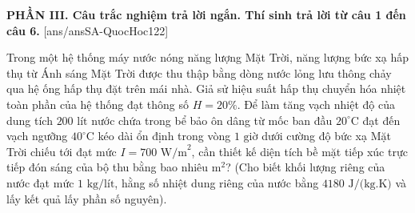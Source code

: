 
\noindent \textbf{PHẦN III. Câu trắc nghiệm trả lời ngắn. Thí sinh trả lời từ câu 1 đến câu 6.}
[ans/ansSA-QuocHoc122]

\begin{ex}%
	Trong một hệ thống máy nước nóng năng lượng Mặt Trời, năng lượng bức xạ hấp thụ từ Ánh sáng Mặt Trời được thu thập bằng dòng nước lỏng lưu thông chảy qua hệ ống hấp thụ đặt trên mái nhà. Giả sử hiệu suất hấp thụ chuyển hóa nhiệt toàn phần của hệ thống đạt thông số $H = 20\%$. Để làm tăng vạch nhiệt độ của dung tích $200\text{ lít}$ nước chứa trong bể bảo ôn dâng từ mốc ban đầu $20^\circ\text{C}$ đạt đến vạch ngưỡng $40^\circ\text{C}$ kéo dài ổn định trong vòng $1\text{ giờ}$ dưới cường độ bức xạ Mặt Trời chiếu tới đạt mức $I = 700\text{ W/m}^2$, cần thiết kế diện tích bề mặt tiếp xúc trực tiếp đón sáng của bộ thu bằng bao nhiêu $\text{m}^2$? (Cho biết khối lượng riêng của nước đạt mức $1\text{ kg/lít}$, hằng số nhiệt dung riêng của nước bằng $4180\text{ J/(kg.K)}$ và lấy kết quả lấy phần số nguyên).
\end{ex}

